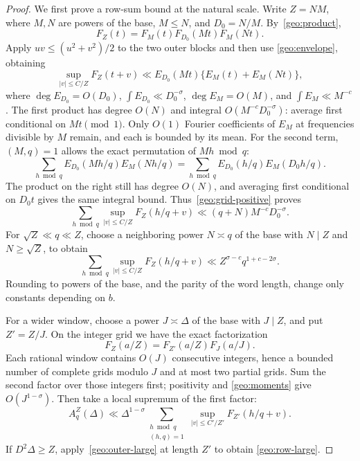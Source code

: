 \documentclass[11pt,a4paper]{article}
\theoremstyle{paperplain}
\numberwithin{equation}{section}
\begin{document}
\begin{proof}
We first prove a row-sum bound at the natural scale.
Write $Z=NM$, where $M,N$ are powers of the base, $M\le N$, and $D_0=N/M$.
By~\eqref{geo:product},
\[
 F_Z(t)=F_M(t)F_{D_0}(Mt)F_M(Nt).
\]
Apply $uv\le(u^2+v^2)/2$ to the two outer blocks and then use
\eqref{geo:envelope}, obtaining
\[
 \sup_{|v|\le C/Z}F_Z(t+v)
 \ll E_{D_0}(Mt)\{E_M(t)+E_M(Nt)\},
\]
where $\deg E_{D_0}=O(D_0)$, $\int E_{D_0}\ll D_0^{-\sigma}$,
$\deg E_M=O(M)$, and $\int E_M\ll M^{-c}$.
The first product has degree $O(N)$ and integral
$O(M^{-c}D_0^{-\sigma})$: average first conditional on $Mt\pmod1$.
Only $O(1)$ Fourier coefficients of $E_M$ at frequencies divisible by $M$
remain, and each is bounded by its mean.
For the second term, $(M,q)=1$ allows the exact permutation of $Mh\bmod q$:
\[
 \sum_{h\bmod q}E_{D_0}(Mh/q)E_M(Nh/q)
 =\sum_{h\bmod q}E_{D_0}(h/q)E_M(D_0h/q).
\]
The product on the right still has degree $O(N)$, and averaging first
conditional on $D_0t$ gives the same integral bound.
Thus~\eqref{geo:grid-positive} proves
\begin{equation}\label{geo:outer-blocks}
 \sum_{h\bmod q}\sup_{|v|\le C/Z}F_Z(h/q+v)
 \ll(q+N)M^{-c}D_0^{-\sigma}.
\end{equation}
For $\sqrt Z\ll q\ll Z$, choose a neighboring power $N\asymp q$ of the base
with $N\mid Z$ and $N\ge\sqrt Z$, to obtain
\begin{equation}\label{geo:outer-large}
 \sum_{h\bmod q}\sup_{|v|\le C/Z}F_Z(h/q+v)
 \ll Z^{\sigma-c}q^{1+c-2\sigma}.
\end{equation}
Rounding to powers of the base, and the parity of the word length, change
only constants depending on $b$.

For a wider window, choose a power $J\asymp\Delta$ of the base with $J\mid Z$,
and put $Z'=Z/J$. On the integer grid we have the exact factorization
\[
 F_Z(a/Z)=F_{Z'}(a/Z)F_J(a/J).
\]
Each rational window contains $O(J)$ consecutive integers, hence a bounded
number of complete grids modulo $J$ and at most two partial grids.
Sum the second factor over those integers first; positivity and
\eqref{geo:moments} give $O(J^{1-\sigma})$. Then take a local supremum of the first
factor:
\begin{equation}\label{geo:window-average}
 A_q^Z(\Delta)\ll\Delta^{1-\sigma}
 \sum_{\substack{h\bmod q\\(h,q)=1}}
 \sup_{|v|\le C'/Z'}F_{Z'}(h/q+v).
\end{equation}
If $D^2\Delta\ge Z$, apply~\eqref{geo:outer-large} at length $Z'$ to obtain
\eqref{geo:row-large}.


\end{proof}
\end{document}
